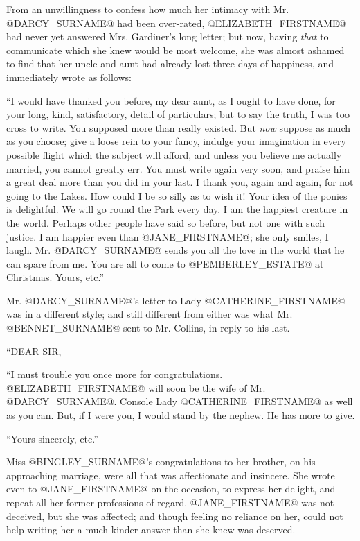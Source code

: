 From an unwillingness to confess how much her intimacy with Mr. @DARCY_SURNAME@
had been over-rated, @ELIZABETH_FIRSTNAME@ had never yet answered Mrs. Gardiner's
long letter; but now, having \textit{that} to communicate which she knew would
be most welcome, she was almost ashamed to find that her uncle and
aunt had already lost three days of happiness, and immediately wrote as
follows:

``I would have thanked you before, my dear aunt, as I ought to have done,
for your long, kind, satisfactory, detail of particulars; but to say the
truth, I was too cross to write. You supposed more than really existed.
But \textit{now} suppose as much as you choose; give a loose rein to your
fancy, indulge your imagination in every possible flight which the
subject will afford, and unless you believe me actually married, you
cannot greatly err. You must write again very soon, and praise him a
great deal more than you did in your last. I thank you, again and again,
for not going to the Lakes. How could I be so silly as to wish it! Your
idea of the ponies is delightful. We will go round the Park every day. I
am the happiest creature in the world. Perhaps other people have said so
before, but not one with such justice. I am happier even than @JANE_FIRSTNAME@; she
only smiles, I laugh. Mr. @DARCY_SURNAME@ sends you all the love in the world that
he can spare from me. You are all to come to @PEMBERLEY_ESTATE@ at Christmas.
Yours, etc.''

Mr. @DARCY_SURNAME@'s letter to Lady @CATHERINE_FIRSTNAME@ was in a different style; and still
different from either was what Mr. @BENNET_SURNAME@ sent to Mr. Collins, in reply
to his last.

``DEAR SIR,

``I must trouble you once more for congratulations. @ELIZABETH_FIRSTNAME@ will soon
be the wife of Mr. @DARCY_SURNAME@. Console Lady @CATHERINE_FIRSTNAME@ as well as you can.
But, if I were you, I would stand by the nephew. He has more to give.

``Yours sincerely, etc.''

Miss @BINGLEY_SURNAME@'s congratulations to her brother, on his approaching
marriage, were all that was affectionate and insincere. She wrote even
to @JANE_FIRSTNAME@ on the occasion, to express her delight, and repeat all her
former professions of regard. @JANE_FIRSTNAME@ was not deceived, but she was
affected; and though feeling no reliance on her, could not help writing
her a much kinder answer than she knew was deserved.

